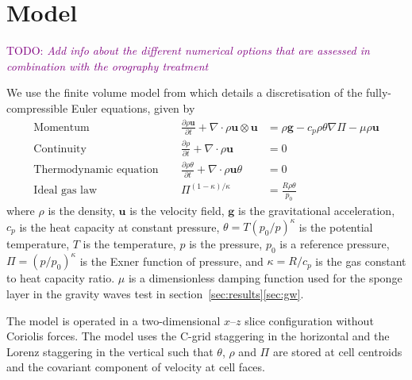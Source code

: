\documentclass[draft]{ametsoc}
\newcommand{\TODO}[1]{\textcolor{purple}{TODO: \emph{#1}}}
\begin{document}
\section{Model}
\label{sec:model}
\TODO{Add info about the different numerical options that are assessed in combination with the orography treatment}

We use the finite volume model from \citet{weller-shahrokhi2014} which details a discretisation of the fully-compressible Euler equations, given by
\begin{subequations}
\begin{align}
	\text{Momentum} &\ &\  	\frac{\partial \rho \mathbf{u}}{\partial t} + \nabla \cdot \rho \mathbf{u}\otimes\mathbf{u} &= \rho \mathbf{g} - c_p \rho \theta \nabla \Pi - \mu \rho \mathbf{u} \label{eq:momentum} \\
	\text{Continuity} &\ &\	\frac{\partial \rho}{\partial t} + \nabla \cdot \rho \mathbf{u} &= 0 \label{eq:cont} \\
	\text{Thermodynamic equation} &\ &\ \frac{\partial \rho \theta}{\partial t} + \nabla \cdot \rho \mathbf{u} \theta &= 0 \label{eq:theta} \\
	\text{Ideal gas law} &\ &\ \Pi^{(1 - \kappa)/\kappa} &= \frac{R \rho \theta}{p_0} \label{eq:state}
\end{align}
\end{subequations}
where \(\rho\) is the density, \(\mathbf{u}\) is the velocity field, \(\mathbf{g}\) is the gravitational acceleration, \(c_p\) is the heat capacity at constant pressure, \(\theta = T \left(p_0/p\right)^\kappa\) is the potential temperature, \(T\) is the temperature, \(p\) is the pressure, \(p_0\) is a reference pressure, \(\Pi = \left(p / p_0 \right)^\kappa\) is the Exner function of pressure, and \(\kappa = R/c_p\) is the gas constant to heat capacity ratio.  \(\mu\) is a dimensionless damping function used for the sponge layer in the gravity waves test in section~\ref{sec:results}\ref{sec:gw}.

The model is operated in a two-dimensional $x$--$z$ slice configuration without Coriolis forces.  The model uses the C-grid staggering in the horizontal and the Lorenz staggering in the vertical such that $\theta$, $\rho$ and $\Pi$ are stored at cell centroids and the covariant component of velocity at cell faces.

\end{document}
